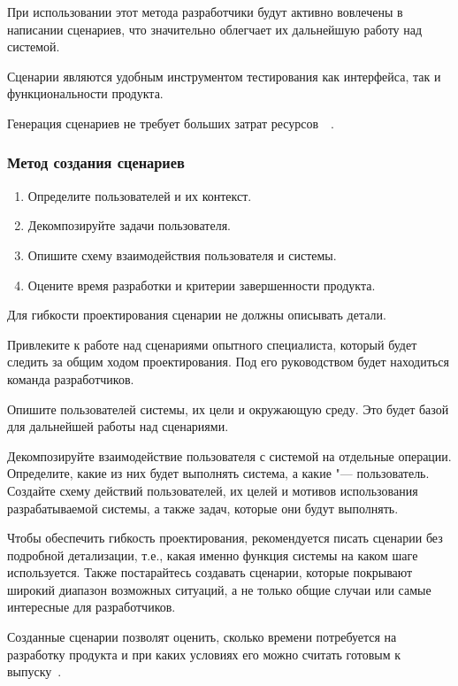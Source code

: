 \documentclass{../industrial-development}
\begin{document}
При использовании этот метода разработчики будут активно вовлечены в написании сценариев, что значительно облегчает их дальнейшую работу над системой.

Сценарии являются удобным инструментом тестирования как интерфейса, так и функциональности продукта.

Генерация сценариев не требует больших затрат ресурсов~\cite[с.~116]{Golovach}~\cite{Usabilitynet-scenarios}.

\begin{frame} \frametitle{Метод создания сценариев}
   \begin{enumerate}
    \item Определите пользователей и их контекст.
    \item Декомпозируйте задачи пользователя.
    \item Опишите схему взаимодействия пользователя и системы.
    \item Оцените время разработки и критерии завершенности продукта.
   \end{enumerate}
   
   \begin{block}{}
    Для гибкости проектирования сценарии не должны описывать детали.
  \end{block}
\end{frame}

\lecturenotes

Привлеките к работе над сценариями опытного специалиста, который будет следить за общим ходом проектирования. Под его руководством будет находиться команда разработчиков.

Опишите пользователей системы, их цели и окружающую среду. Это будет базой для дальнейшей работы над сценариями.

Декомпозируйте взаимодействие пользователя с системой на отдельные операции. Определите, какие из них будет выполнять система, а какие "--- пользователь. Создайте схему действий пользователей, их целей и мотивов использования разрабатываемой системы, а также задач, которые они будут выполнять.

Чтобы обеспечить гибкость проектирования, рекомендуется писать сценарии без подробной детализации, т.е., какая именно функция системы на каком шаге используется. Также постарайтесь создавать сценарии, которые покрывают широкий диапазон возможных ситуаций, а не только общие случаи или самые интересные для разработчиков.

Созданные сценарии позволят оценить, сколько времени потребуется на разработку продукта и при каких условиях его можно считать готовым к выпуску~\cite{Usabilitynet-scenarios}.
\end{document}
